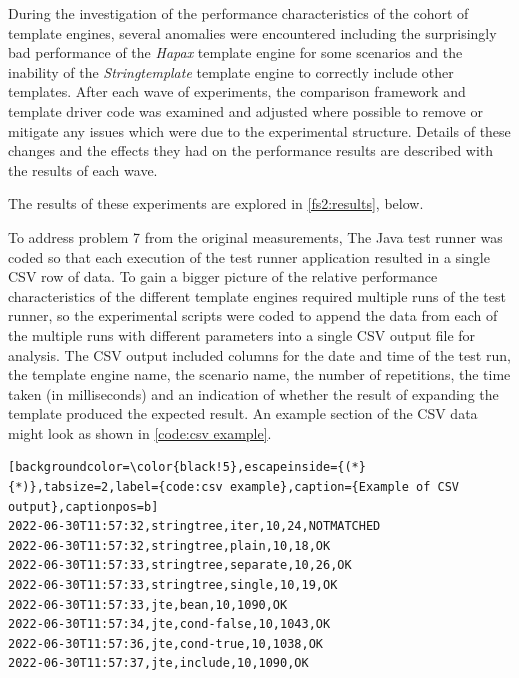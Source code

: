 During the investigation of the performance characteristics of the cohort of template engines, several anomalies were encountered including the surprisingly bad performance of the \emph{Hapax} template engine for some scenarios and the inability of the \emph{Stringtemplate} template engine to correctly include other templates. After each wave of experiments, the comparison framework and template driver code was examined and adjusted where possible to remove or mitigate any issues which were due to the experimental structure. Details of these changes and the effects they had on the performance results are described with the results of each wave.

The results of these experiments are explored in \autoref{fs2:results}, below.

To address problem 7 from the original measurements, The Java test runner was coded so that each execution of the test runner application resulted in a single CSV row of data. To gain a bigger picture of the relative performance characteristics of the different template engines required multiple runs of the test runner, so the experimental scripts were coded to append the data from each of the multiple runs with different parameters into a single CSV output file for analysis. The CSV output included columns for the date and time of the test run, the template engine name, the scenario name, the number of repetitions, the time taken (in milliseconds) and an indication of whether the result of expanding the template produced the expected result. An example section of the CSV data might look as shown in \autoref{code:csv example}.

\begin{lstlisting}[backgroundcolor=\color{black!5},escapeinside={(*}{*)},tabsize=2,label={code:csv example},caption={Example of CSV output},captionpos=b]
2022-06-30T11:57:32,stringtree,iter,10,24,NOTMATCHED
2022-06-30T11:57:32,stringtree,plain,10,18,OK
2022-06-30T11:57:33,stringtree,separate,10,26,OK
2022-06-30T11:57:33,stringtree,single,10,19,OK
2022-06-30T11:57:33,jte,bean,10,1090,OK
2022-06-30T11:57:34,jte,cond-false,10,1043,OK
2022-06-30T11:57:36,jte,cond-true,10,1038,OK
2022-06-30T11:57:37,jte,include,10,1090,OK
\end{lstlisting}

